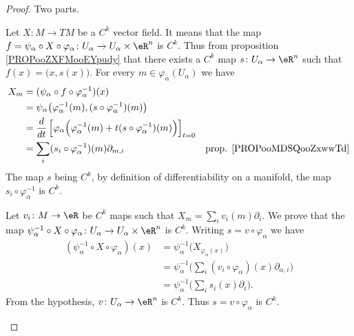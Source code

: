 \begin{proof}
	Two parts.
	\begin{subproof}
		\spitem[\( \Rightarrow\)]
		Let \(X \colon M\to TM  \) be a \( C^k\) vector field. It means that the map \(f=\psi_{\alpha}\circ X\circ\varphi_{\alpha} \colon U_{\alpha}\to U_{\alpha}\times \eR^n  \) is \( C^k\). Thus from proposition \ref{PROPooZXFMooEYpudy} that there exists a \( C^k\) map \(s \colon U_{\alpha}\to \eR^n  \) such that \( f(x)=\big( x,s(x) \big)\). For every \( m\in \varphi_{\alpha}(U_{\alpha}) \) we have
		\begin{subequations}
			\begin{align}
				X_m & =(\psi_{\alpha}\circ f\circ \varphi_{\alpha}^{-1})(x)                                                                                                              \\
				    & =\psi_{\alpha}\big( \varphi_{\alpha}^{-1}(m),(s\circ\varphi_{\alpha}^{-1})(m) \big)                                                                                \\
				    & =\frac{d}{dt} \left[ \varphi_{\alpha}\Big( \varphi_{\alpha}^{-1}(m)+t(s\circ\varphi_{\alpha}^{-1})(m) \Big)  \right]_{t=0}                                         \\
				    & = \sum_i(s_i\circ\varphi_{\alpha}^{-1})(m)\partial_{m,i}                                                                   & \text{prop. \ref{PROPooMDSQooZxwwTd}}
			\end{align}
		\end{subequations}
		The map \( s\) being \( C^k\), by definition of differentiability on a manifold, the map \( s_i\circ\varphi_{\alpha}^{-1}\) is \( C^k\).

		\spitem[\( \Leftarrow\)]
		Let \(v_i \colon M\to \eR  \) be \( C^k\) maps such that \( X_m=\sum_iv_i(m)\partial_i\). We prove that the map \(\psi_{\alpha}^{-1}\circ X\circ \varphi_{\alpha} \colon U_{\alpha}\to U_{\alpha}\times \eR^n  \) is \( C^k\). Writing \( s=v\circ\varphi_{\alpha}\) we have
		\begin{subequations}
			\begin{align}
				(\psi_{\alpha}^{-1}\circ X\circ\varphi_{\alpha})(x) & =\psi_{\alpha}^{-1}\big( X_{\varphi_{\alpha}(x)} \big)                                  \\
				                                                    & =\psi_{\alpha}^{-1}\Big( \sum_i(v_i\circ \varphi_{\alpha})(x)\partial_{\alpha, i} \Big) \\
				                                                    & =\psi_{\alpha}^{-1}\big( \sum_is_i(x)\partial_i \big).
			\end{align}
		\end{subequations}
		From the hypothesis, \(v \colon U_{\alpha}\to \eR^n  \) is \( C^k\). Thus \( s=v\circ\varphi_{\alpha}\) is \( C^k\).
	\end{subproof}
\end{proof}


